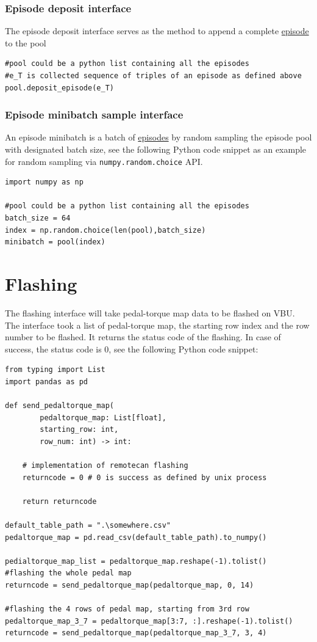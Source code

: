 \documentclass[a4paper, 11pt]{article}
\begin{document}
\subsubsection{Episode deposit interface}
\label{sec:orgf854314}
The episode deposit interface serves as the method to append a complete \hyperref[sec:org22c469d]{episode} to the pool

\begin{verbatim}
#pool could be a python list containing all the episodes
#e_T is collected sequence of triples of an episode as defined above
pool.deposit_episode(e_T)
\end{verbatim}
\subsubsection{Episode minibatch sample interface}
\label{sec:orge76beac}
An episode minibatch\label{episode_minibatch} is a batch of \hyperref[sec:org22c469d]{episodes} by random sampling the episode pool with designated batch size, see the following Python code snippet as an example for random sampling via \texttt{numpy.random.choice} API.

\begin{verbatim}
import numpy as np

#pool could be a python list containing all the episodes
batch_size = 64
index = np.random.choice(len(pool),batch_size)
minibatch = pool(index)
\end{verbatim}
\section{Flashing}
\label{sec:org5ea3c09}

The flashing interface will take pedal-torque map data to be flashed on VBU. The interface took a list of pedal-torque map, the starting row index and the row number to be flashed. It returns the status code of the flashing. In case of success, the status code is 0, see the following Python code snippet:

\begin{verbatim}
from typing import List
import pandas as pd

def send_pedaltorque_map(
		pedaltorque_map: List[float],
		starting_row: int,
		row_num: int) -> int:

	# implementation of remotecan flashing
	returncode = 0 # 0 is success as defined by unix process

	return returncode

default_table_path = ".\somewhere.csv"
pedaltorque_map = pd.read_csv(default_table_path).to_numpy()

pedialtorque_map_list = pedaltorque_map.reshape(-1).tolist()
#flashing the whole pedal map
returncode = send_pedaltorque_map(pedaltorque_map, 0, 14)

#flashing the 4 rows of pedal map, starting from 3rd row
pedaltorque_map_3_7 = pedaltorque_map[3:7, :].reshape(-1).tolist()
returncode = send_pedaltorque_map(pedaltorque_map_3_7, 3, 4)

\end{verbatim}
\end{document}
